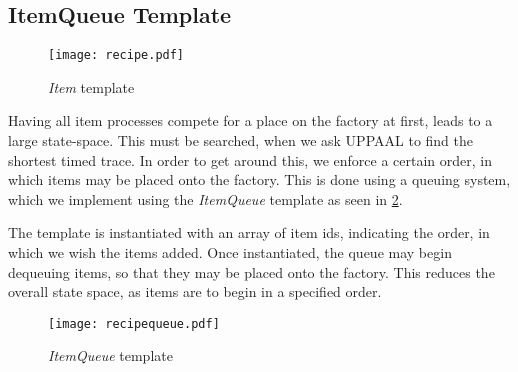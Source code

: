 \subsection{ItemQueue Template}\label{subs:recipequeue}

\begin{figure}[h]
\centering
\texttt{[image: recipe.pdf]}
\caption{\textit{Item} template}
\label{fig:recipe}
\end{figure}

Having all item processes compete for a place on the factory at first, leads to a large state-space. This must be searched, when we ask UPPAAL to find the shortest timed trace. In order to get around this, we enforce a certain order, in which items may be placed onto the factory. This is done using a queuing system, which we implement using the \emph{ItemQueue} template as seen in \cref{fig:recipequeue}.

The template is instantiated with an array of item ids, indicating the order, in which we wish the items added. Once instantiated, the queue may begin dequeuing items, so that they may be placed onto the factory. This reduces the overall state space, as items are to begin in a specified order. 

\begin{figure}[h]
\centering
\texttt{[image: recipequeue.pdf]}
\caption{\textit{ItemQueue} template}
\label{fig:recipequeue}
\end{figure}